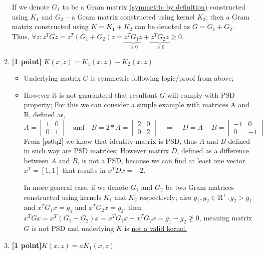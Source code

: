 \documentclass{article}
\begin{document}
\begin{enumerate}[label=\alph*)]
If we denote $G_1$ to be a Gram matrix  \href{https://en.wikipedia.org/wiki/Gram_matrix}{(symmetric by definition)} constructed using $K_1$ and  $G_2$ -- a Gram matrix constructed using  kernel $K_2$; then a Gram matrix constructed using $K = K_1 + K_2$ can be denoted as $G=G_1 + G_2$. Thus, $\forall z: z^TGz = z^T(G_1 + G_2)z = \underbrace{z^TG_1z}_{\geq 0} + \underbrace{z^TG_2z}_{\geq 0} \geq 0 $.




\item \textbf{[1 point]}  $K(x, z) = K_1(x, z) - K_2(x, z)$
\begin{itemize}
    \item Underlying matrix $G$ is symmetric following logic/proof from above;

\item However it is not guaranteed that resultant $G$ will comply with PSD property; For this we can consider a simple example with matrices A and B, defined as,
\[
A=\begin{bmatrix}
    1 & 0\\
    0 & 1
\end{bmatrix} \quad\mbox{and}\quad
    B = 2*A = \begin{bmatrix}
    2 & 0\\
    0 & 2
\end{bmatrix}\quad\Rightarrow\quad D=A-B=\begin{bmatrix}
    -1 & 0\\
    0 & -1
\end{bmatrix}
\]
From [ps0q2] we know that identity matrix is PSD, thus $A$ and $B$ defined in such way are PSD matrices; However matrix $D$, defined as a difference between $A$ and $B$, is not a PSD, because we can find at least one vector $x^T=[1,1]$ that results in $x^TDx = -2$.

 In more general case, if we denote $G_1$ and $G_2$ be two Gram matrices constructed using kernels $K_1$ and $K_2$ respectively; also  $g_1, g_2\in\mathrm{R}^{+}: g_2>g_1$ and $x^TG_1x = g_1$ and $x^TG_2x = g_2$, then $x^TGx = x^T(G_1 - G_2)x = x^TG_1x - x^TG_2x = g_1 - g_2 \not\geq 0$, meaning matrix $G$ is not PSD and underlying $K$ is \underline{not a valid kernel.}
\end{itemize}



\item \textbf{[1 point]}$K(x, z) = aK_1(x, z)$


\end{enumerate}
\end{document}
